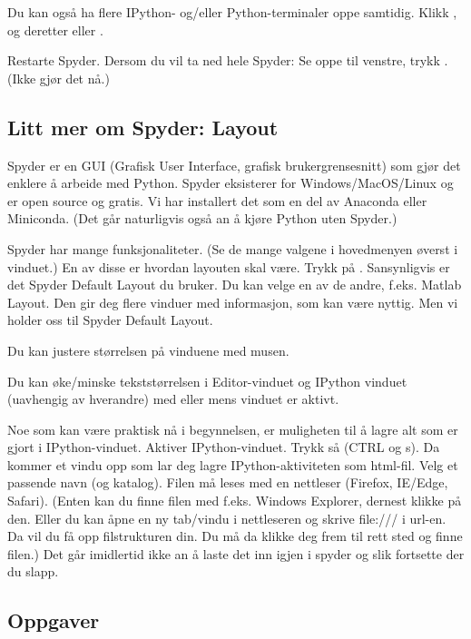 {Du kan også ha flere IPython- og/eller Python-terminaler oppe samtidig. Klikk , og deretter  eller .

Restarte Spyder. Dersom du vil ta ned hele Spyder: Se oppe til venstre, trykk . (Ikke gjør det nå.) 

\subsection{Litt mer om Spyder: Layout} 
Spyder er en GUI (Grafisk User Interface, grafisk brukergrensesnitt) som gjør det enklere å arbeide med Python. Spyder eksisterer for Windows/MacOS/Linux og er open source og gratis. Vi har installert det som en del av Anaconda eller Miniconda. (Det går naturligvis også an å kjøre Python uten Spyder.)

Spyder har mange funksjonaliteter. (Se de mange valgene i hovedmenyen øverst i vinduet.) En av disse er hvordan layouten skal være. Trykk på . Sansynligvis er det Spyder Default Layout du bruker. Du kan velge en av de andre, f.eks. Matlab Layout. Den gir deg flere vinduer med informasjon, som kan være nyttig. Men vi holder oss til Spyder Default Layout.

Du kan justere størrelsen på vinduene med musen.

Du kan øke/minske tekststørrelsen i Editor-vinduet og IPython vinduet (uavhengig av hverandre) med  eller  mens vinduet er aktivt.

Noe som kan være praktisk nå i begynnelsen, er muligheten til å lagre alt som er gjort i IPython-vinduet. Aktiver IPython-vinduet. Trykk så  (CTRL og s). Da kommer et vindu opp som lar deg lagre IPython-aktiviteten som html-fil. Velg et passende navn (og katalog). Filen må leses med en nettleser (Firefox, IE/Edge, Safari). (Enten kan du finne filen med f.eks. Windows Explorer, dernest klikke på den. Eller du kan åpne en ny tab/vindu i nettleseren og skrive file:/// i url-en. Da vil du få opp filstrukturen din. Du må da klikke deg frem til rett sted og finne filen.) Det går imidlertid ikke an å laste det inn igjen i spyder og slik fortsette der du slapp. 

\subsection{Oppgaver}

}
